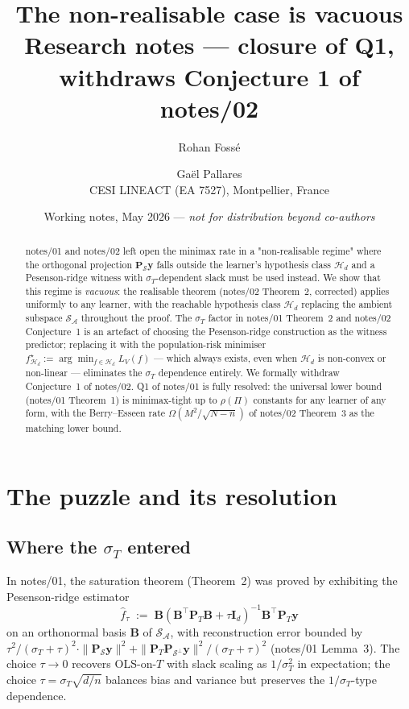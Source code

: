 \documentclass[11pt,a4paper]{article}
\title{\textbf{The non-realisable case is vacuous}\\
\large{Research notes — closure of Q1, withdraws Conjecture 1 of notes/02}}
\author{Rohan Fossé \and Gaël Pallares\\
\small{CESI LINEACT (EA 7527), Montpellier, France}}
\date{Working notes, May 2026 — \emph{not for distribution beyond co-authors}}
\theoremstyle{plain}
\theoremstyle{definition}
\theoremstyle{remark}
\newcommand{\by}{\mathbf{y}}
\newcommand{\bP}{\mathbf{P}}
\newcommand{\bB}{\mathbf{B}}
\newcommand{\bI}{\mathbf{I}}
\newcommand{\Scal}{\mathcal{S}}
\newcommand{\Acal}{\mathcal{A}}
\newcommand{\Hcal}{\mathcal{H}}
\begin{document}
\maketitle

\begin{abstract}
notes/01 and notes/02 left open the minimax rate in a "non-realisable
regime" where the orthogonal projection $\bP_\Scal\by$ falls outside the
learner's hypothesis class $\Hcal_d$ and a Pesenson-ridge witness with
$\sigma_T$-dependent slack must be used instead.
We show that this regime is \emph{vacuous}: the realisable theorem
(notes/02 Theorem~2, corrected) applies uniformly to any learner, with
the reachable hypothesis class $\Hcal_d$ replacing the ambient subspace
$\Scal_\Acal$ throughout the proof.  The $\sigma_T$ factor in notes/01
Theorem~2 and notes/02 Conjecture~1 is an artefact of choosing the
Pesenson-ridge construction as the witness predictor; replacing it with
the population-risk minimiser $f^\star_{\Hcal_d} := \arg\min_{f \in
\Hcal_d} L_V(f)$ —  which always exists, even when $\Hcal_d$ is
non-convex or non-linear — eliminates the $\sigma_T$ dependence entirely.
We formally withdraw Conjecture~1 of notes/02.  Q1 of notes/01 is
fully resolved: the universal lower bound (notes/01 Theorem~1) is
minimax-tight up to $\rho(\Pi)$ constants for any learner of any
form, with the Berry--Esseen rate $\Omega(M^2/\sqrt{N-n})$ of
notes/02 Theorem~3 as the matching lower bound.
\end{abstract}

\section{The puzzle and its resolution}
\label{sec:puzzle}

\subsection{Where the $\sigma_T$ entered}

In notes/01, the saturation theorem (Theorem~2) was proved by exhibiting
the Pesenson-ridge estimator
\begin{equation}
    \hat f_\tau \;:=\; \bB(\bB^\top \bP_T \bB + \tau \bI_d)^{-1} \bB^\top \bP_T \by
    \label{eq:pesenson-ridge-recall}
\end{equation}
on an orthonormal basis $\bB$ of $\Scal_\Acal$, with reconstruction
error bounded by $\tau^2/(\sigma_T + \tau)^2 \cdot \|\bP_\Scal\by\|^2 +
\|\bP_T \bP_{\Scal^\perp}\by\|^2/(\sigma_T + \tau)^2$
(notes/01 Lemma~3).  The choice $\tau \to 0$ recovers OLS-on-$T$ with
slack scaling as $1/\sigma_T^2$ in expectation; the choice
$\tau = \sigma_T \sqrt{d/n}$ balances bias and variance but
preserves the $1/\sigma_T$-type dependence.
\end{document}
